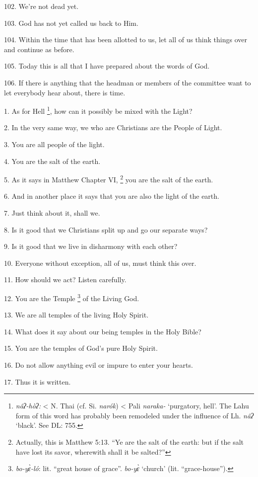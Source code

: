 102. We're not dead yet.

103. God has not yet called us back to Him.

104. Within the time that has been allotted to us, let all of us think things over
and continue as before.

105. Today this is all that I have prepared about the words of God.

106. If there is anything that the headman or members of the committee want to
let everybody hear about, there is time.

1. As for Hell \footnote{\textit{nâʔ-hòʔ:} < N. Thai (cf. Si. \textit{narók}) < Pali \textit{naraka-} `purgatory, hell'. The Lahu form of this word has probably been remodeled under the influence of Lh. \textit{nâʔ} `black'. See DL: 755.}, how can it possibly be mixed with the Light?

2. In the very same way, we who are Christians are the People of Light.

3. You are all people of the light.

4. You are the salt of the earth.

5. As it says in Matthew Chapter VI, \footnote{Actually, this is Matthew 5:13. ``Ye are the salt of the earth: but if the salt have lost its savor, wherewith shall it be salted?''} you are the salt of the earth.

6. And in another place it says that you are also the light of the earth.

7. Just think about it, shall we.

8. Is it good that we Christians split up and go our separate ways?

9. Is it good that we live in disharmony with each other?

10. Everyone without exception, all of us, must think this over.

11. How should we act? Listen carefully.

12. You are the Temple \footnote{\textit{bo-yɛ̀-ló}: lit. ``great house of grace''. \textit{bo-yɛ̀} `church' (lit. ``grace-house'').} of the Living God.

13. We are all temples of the living Holy Spirit.

14. What does it say about our being temples in the Holy Bible?

15. You are the temples of God's pure Holy Spirit.

16. Do not allow anything evil or impure to enter your hearts.

17. Thus it is written.

